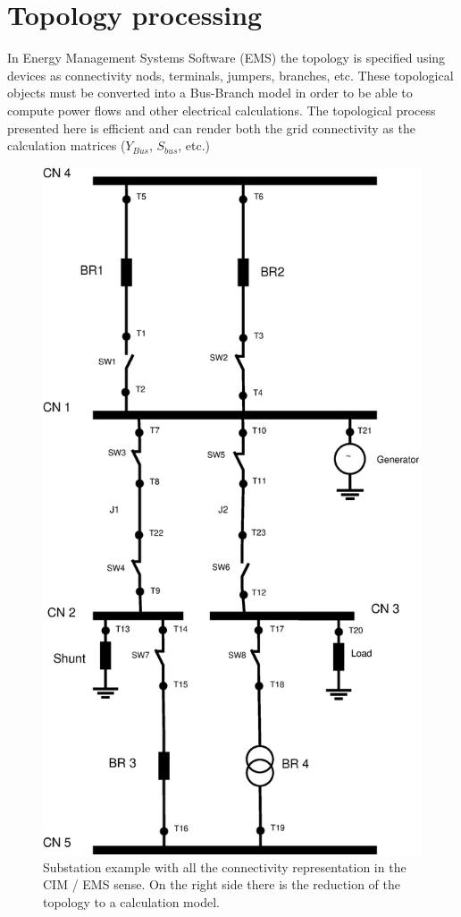 \documentclass[nols,a4paper,twoside,notoc,fleqn]{tufte-book}
\begin{document}





\newpage
\section{Topology processing}
\label{TopologyProcessing}
 In Energy Management Systems Software (EMS) the topology is specified using devices as connectivity nods, terminals, jumpers, branches, etc. These topological objects must be converted into a Bus-Branch model in order to be able to compute power flows and other electrical calculations. The topological process presented here is efficient and can render both the grid connectivity as the calculation matrices ($Y_{Bus}$, $S_{bus}$, etc.)

\begin{figure}[h!]
	\includegraphics[width=0.7\linewidth]{img/Substation.eps}
	\caption{Substation example with all the connectivity representation in the CIM / EMS sense. On the right side there is the reduction of the topology to a calculation model.}
	\label{substation_model}
\end{figure}
\end{document}
